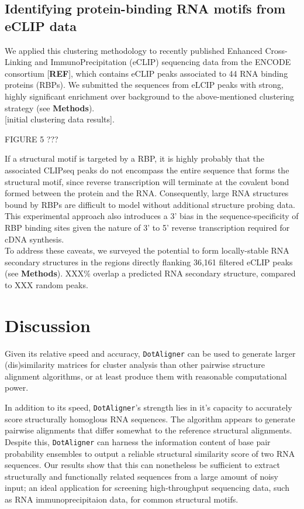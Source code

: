 \documentclass[a4paper,11pt]{article}
\newcommand\dotaligner{\texttt{DotAligner}}
\begin{document}
\subsection*{ Identifying protein-binding RNA motifs from eCLIP data }
We applied this clustering methodology to recently published Enhanced Cross-Linking 
and ImmunoPrecipitation (eCLIP) sequencing data from the ENCODE consortium [\textbf{REF}], 
which contains eCLIP peaks associated to 44 RNA binding proteins (RBPs). We submitted the
sequences from eLCIP peaks with strong, highly significant enrichment over background 
to the above-mentioned clustering strategy (see \textbf{Methods}). \\

[initial clustering data results]. \\

\begin{center}
FIGURE 5 ??? 
\end{center}

If a structural motif is targeted by a RBP, it is highly probably that the associated CLIPseq peaks 
do not encompass the entire sequence that forms the structural motif, since 
reverse transcription will terminate at the covalent bond formed between the 
protein and the RNA. Consequently, large RNA structures bound by RBPs are 
difficult to model without additional structure probing data. This experimental 
approach also introduces a 3' bias in the sequence-specificity of RBP binding sites 
given the nature of 3' to 5' reverse transcription required for cDNA synthesis.\\

To address these caveats, we surveyed the potential to form locally-stable
RNA secondary structures in the regions directly flanking 36,161 filtered eCLIP 
peaks (see \textbf{Methods}). XXX\% overlap a predicted RNA secondary structure, 
compared to XXX random peaks. \\


\section*{Discussion}
Given its relative speed and accuracy, \dotaligner{} can be used to generate larger 
(dis)similarity matrices for cluster analysis than other pairwise structure 
alignment algorithms, or at least produce them with reasonable computational 
power.  

In addition to its speed, \dotaligner{}'s strength lies in it's capacity to accurately
score structurally homoglous RNA sequences. The algorithm appears to 
generate pairwise alignments that differ somewhat to the reference 
structural alignments. Despite this, \dotaligner{} can harness the information
content of base pair probability ensembles to output a reliable 
structural similarity score of two RNA sequences. Our results show that this
can nonetheless be sufficient to extract structurally and functionally related
sequences from a large amount of noisy input; an ideal application 
for screening high-throughput sequencing data, such as RNA 
immunoprecipitaion data, for common structural motifs. 
\end{document}
